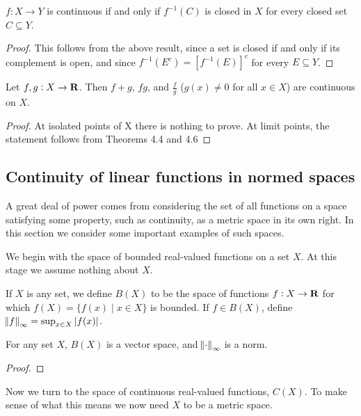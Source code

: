 \begin{corollary}
$f:X\to Y$ is continuous if and only if $f^{-1}(C)$ is closed in $X$ for every closed set $C\subseteq Y$.
\end{corollary}

\begin{proof}
This follows from the above result, since a set is closed if and only if its complement is open, and since $f^{-1}(E^c)=[f^{-1}(E)]^c$ for every $E\subseteq Y$.
\end{proof}

\begin{proposition}
Let $f,g:X\to\mathbf R$. Then $f+g$, $fg$, and $\frac{f}{g}$ ($g(x)\neq0$ for all $x\in X$) are continuous on $X$.
\end{proposition}

\begin{proof}
At isolated points of X there is nothing to prove. At limit points, the statement follows from Theorems 4.4 and 4.6
\end{proof}




\subsection{Continuity of linear functions in normed spaces}
A great deal of power comes from considering the set of all functions on a space satisfying some property, such as continuity, as a metric space in its own right. In this section we consider some important examples of such spaces.

We begin with the space of bounded real-valued functions on a set $X$. At this stage we assume nothing about $X$.

\begin{definition}
If $X$ is any set, we define $B(X)$ to be the space of functions $f:X\to\mathbf R$ for which $f(X)=\{f(x)\mid x\in X\}$ is bounded. If $f\in B(X)$, define $\norm{f}_\infty=\sup_{x\in X}|f(x)|$.
\end{definition}

\begin{lemma}
For any set $X$, $B(X)$ is a vector space, and $\norm{\cdot}_\infty$ is a norm.
\end{lemma}

\begin{proof}

\end{proof}

Now we turn to the space of continuous real-valued functions, $C(X)$. To make sense of what this means we now need $X$ to be a metric space.

